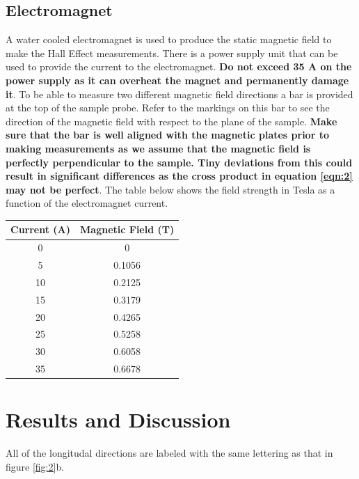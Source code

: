 \documentclass[twocolumn]{article}
\begin{document}
\subsection{Electromagnet}
A water cooled electromagnet is used to produce the static magnetic field to 
make the Hall Effect measurements. There is a power supply unit that can be 
used to provide the current to the electromagnet. \textbf{Do not exceed 35 A 
on the power supply as it can overheat the magnet and permanently damage it}. 
To be able to measure two different magnetic field directions a bar is provided 
at the top of the sample probe. Refer to the markings on this bar to see the 
direction of the magnetic field with respect to the plane of the sample. 
\textbf{Make sure that the bar is well aligned with the magnetic plates prior 
to making measurements as we assume that the magnetic field is perfectly 
perpendicular to the sample. Tiny deviations from this could result in 
significant differences as the cross product in equation \ref{eqn:2} may not 
be perfect}. The table below shows the field strength in Tesla as a function 
of the electromagnet current.
\begin{minipage}{\linewidth}
\Centering
\begin{tabular}{|c|c|}
\hline
Current (A) & Magnetic Field (T) \\\hline
0 & 0 \\ \hline
5 & 0.1056 \\ \hline
10 & 0.2125 \\ \hline
15 & 0.3179 \\ \hline
20 & 0.4265 \\ \hline
25 & 0.5258 \\ \hline
30 & 0.6058 \\ \hline
35 & 0.6678 \\ \hline
\end{tabular}
\label{tbl:2}
\end{minipage}
\section{Results and Discussion}
All of the longitudal directions are labeled with the same lettering as that in 
figure \ref{fig:2}b.
\end{document}
